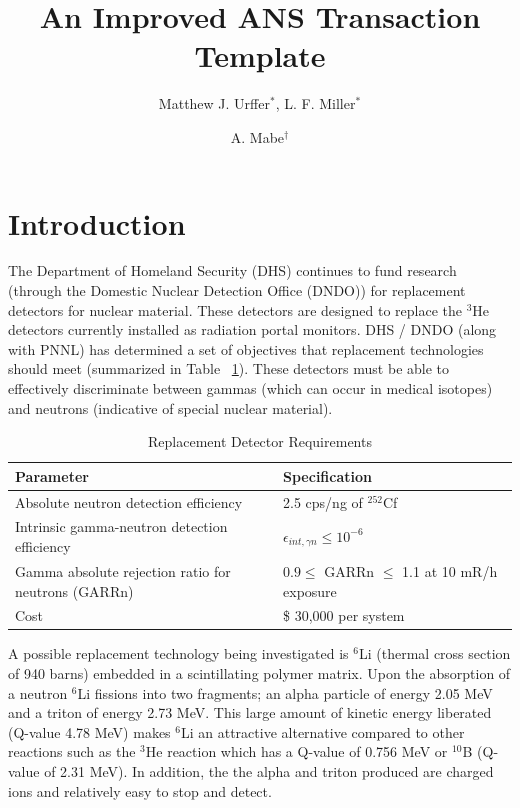 \documentclass{anstrans}
\title{An Improved ANS Transaction Template}
\author{Matthew J. Urffer$^{*}$, L. F. Miller$^{*}$ \and A. Mabe$^{\dagger}$}
\institute{
$^{*}$Department of Nuclear Engineering, University of Tennessee, Knoxville, TN, 37916
\and
$^{\dagger}$Department of Chemistry, University of Tennessee, Knoxville, TN, 37916
}
\newcommand{\iso}[2]{${}^{#2}${#1}}
\begin{document}
\section{Introduction}
The Department of Homeland Security (DHS) continues to fund research (through the Domestic Nuclear Detection Office (DNDO)) for replacement detectors for nuclear material.
These detectors are designed to replace the \iso{He}{3} detectors currently installed as radiation portal monitors.
DHS / DNDO (along with PNNL) has determined a set of objectives that replacement technologies should meet (summarized in Table ~\ref{tab:DHSCriteria}).
These detectors must be able to effectively discriminate between gammas (which can occur in medical isotopes) and neutrons (indicative of special nuclear material).
\begin{table}[h]
    \caption{Replacement Detector Requirements  }
	\centering
	\begin{tabular}{p{} | p{} }
	Parameter & Specification \\
	\hline
	\hline
	Absolute neutron detection efficiency & 2.5 cps/ng of ${}^{252}$Cf \\
	Intrinsic gamma-neutron detection efficiency & $ \epsilon_{int,\gamma n}\leq 10^{-6}$ \\
	Gamma absolute rejection ratio for neutrons (GARRn) & $ 0.9 \leq \text{ GARRn }\leq$ 1.1 at 10 mR/h exposure \\
	Cost &  \$ 30,000 per system \\
	\hline
	\end{tabular}
    \label{tab:DHSCriteria}
\end{table}

A possible replacement technology being investigated is \iso{Li}{6} (thermal cross section of 940 barns) embedded in a scintillating polymer matrix.
Upon the absorption of a neutron \iso{Li}{6} fissions into two fragments; an alpha particle of energy 2.05 MeV and a triton of energy 2.73 MeV.
This large amount of kinetic energy liberated (Q-value 4.78 MeV) makes \iso{Li}{6} an attractive alternative compared to other reactions such as the \iso{He}{3} reaction which has a Q-value of 0.756 MeV or \iso{B}{10} (Q-value of 2.31 MeV).
In addition, the the alpha and triton produced are charged ions and relatively easy to stop and detect.
\end{document}
